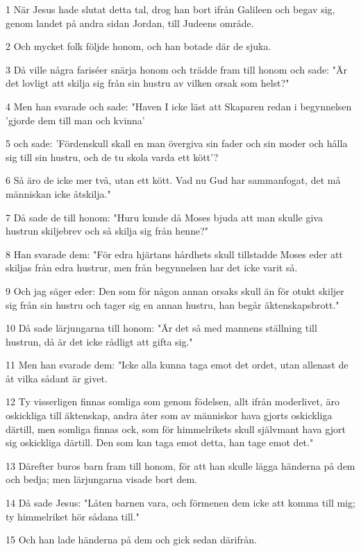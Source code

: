 \par 1 När Jesus hade slutat detta tal, drog han bort ifrån Galileen och begav sig, genom landet på andra sidan Jordan, till Judeens område.
\par 2 Och mycket folk följde honom, och han botade där de sjuka.
\par 3 Då ville några fariséer snärja honom och trädde fram till honom och sade: "Är det lovligt att skilja sig från sin hustru av vilken orsak som helst?"
\par 4 Men han svarade och sade: "Haven I icke läst att Skaparen redan i begynnelsen 'gjorde dem till man och kvinna'
\par 5 och sade: 'Fördenskull skall en man övergiva sin fader och sin moder och hålla sig till sin hustru, och de tu skola varda ett kött'?
\par 6 Så äro de icke mer två, utan ett kött. Vad nu Gud har sammanfogat, det må människan icke åtskilja."
\par 7 Då sade de till honom: "Huru kunde då Moses bjuda att man skulle giva hustrun skiljebrev och så skilja sig från henne?"
\par 8 Han svarade dem: "För edra hjärtans hårdhets skull tillstadde Moses eder att skiljas från edra hustrur, men från begynnelsen har det icke varit så.
\par 9 Och jag säger eder: Den som för någon annan orsaks skull än för otukt skiljer sig från sin hustru och tager sig en annan hustru, han begår äktenskapsbrott."
\par 10 Då sade lärjungarna till honom: "Är det så med mannens ställning till hustrun, då är det icke rådligt att gifta sig."
\par 11 Men han svarade dem: "Icke alla kunna taga emot det ordet, utan allenast de åt vilka sådant är givet.
\par 12 Ty visserligen finnas somliga som genom födelsen, allt ifrån moderlivet, äro oskickliga till äktenskap, andra åter som av människor hava gjorts oskickliga därtill, men somliga finnas ock, som för himmelrikets skull självmant hava gjort sig oskickliga därtill. Den som kan taga emot detta, han tage emot det."
\par 13 Därefter buros barn fram till honom, för att han skulle lägga händerna på dem och bedja; men lärjungarna visade bort dem.
\par 14 Då sade Jesus: "Låten barnen vara, och förmenen dem icke att komma till mig; ty himmelriket hör sådana till."
\par 15 Och han lade händerna på dem och gick sedan därifrån.
